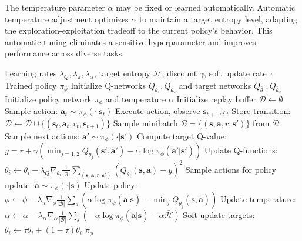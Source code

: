 The temperature parameter $\alpha$ may be fixed or learned automatically. Automatic temperature adjustment optimizes $\alpha$ to maintain a target entropy level, adapting the exploration-exploitation tradeoff to the current policy's behavior. This automatic tuning eliminates a sensitive hyperparameter and improves performance across diverse tasks.

\begin{algorithm}[htbp]
\caption{Soft Actor-Critic (SAC)}
\label{alg:sac}
\begin{algorithmic}[1]
\Require Learning rates $\lambda_Q, \lambda_\pi, \lambda_\alpha$, target entropy $\bar{\mathcal{H}}$, discount $\gamma$, soft update rate $\tau$
\Ensure Trained policy $\pi_\phi$
\State Initialize Q-networks $Q_{\theta_1}, Q_{\theta_2}$ and target networks $Q_{\bar{\theta}_1}, Q_{\bar{\theta}_2}$
\State Initialize policy network $\pi_\phi$ and temperature $\alpha$
\State Initialize replay buffer $\mathcal{D} \gets \emptyset$
        \State Sample action: $\mathbf{a}_t \sim \pi_\phi(\cdot | \mathbf{s}_t)$
        \State Execute action, observe $\mathbf{s}_{t+1}, r_t$
        \State Store transition: $\mathcal{D} \gets \mathcal{D} \cup \{(\mathbf{s}_t, \mathbf{a}_t, r_t, \mathbf{s}_{t+1})\}$
    \EndFor
        \State Sample minibatch $\mathcal{B} = \{(\mathbf{s}, \mathbf{a}, r, \mathbf{s}')\}$ from $\mathcal{D}$
        \State Sample next actions: $\tilde{\mathbf{a}}' \sim \pi_\phi(\cdot | \mathbf{s}')$
        \State Compute target Q-value:
        \State \quad $y = r + \gamma \left( \min_{j=1,2} Q_{\bar{\theta}_j}(\mathbf{s}', \tilde{\mathbf{a}}') - \alpha \log \pi_\phi(\tilde{\mathbf{a}}' | \mathbf{s}') \right)$
        \State Update Q-functions:
        \State \quad $\theta_i \gets \theta_i - \lambda_Q \nabla_{\theta_i} \frac{1}{|\mathcal{B}|} \sum_{(\mathbf{s},\mathbf{a},r,\mathbf{s}')} (Q_{\theta_i}(\mathbf{s}, \mathbf{a}) - y)^2$
        \State Sample actions for policy update: $\tilde{\mathbf{a}} \sim \pi_\phi(\cdot | \mathbf{s})$
        \State Update policy:
        \State \quad $\phi \gets \phi - \lambda_\pi \nabla_\phi \frac{1}{|\mathcal{B}|} \sum_\mathbf{s} \left( \alpha \log \pi_\phi(\tilde{\mathbf{a}} | \mathbf{s}) - \min_{j} Q_{\theta_j}(\mathbf{s}, \tilde{\mathbf{a}}) \right)$
        \State Update temperature:
        \State \quad $\alpha \gets \alpha - \lambda_\alpha \nabla_\alpha \frac{1}{|\mathcal{B}|} \sum_\mathbf{s} \left( -\alpha \log \pi_\phi(\tilde{\mathbf{a}} | \mathbf{s}) - \alpha \bar{\mathcal{H}} \right)$
        \State Soft update targets: $\bar{\theta}_i \gets \tau \theta_i + (1-\tau) \bar{\theta}_i$
    \EndFor
\EndFor
\State \Return $\pi_\phi$
\end{algorithmic}
\end{algorithm}

